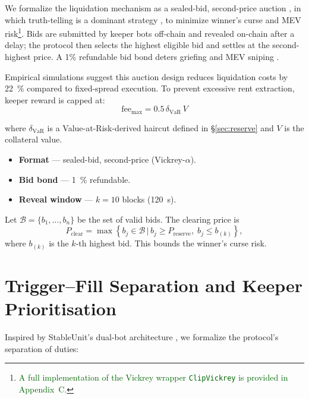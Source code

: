 \documentclass[11pt]{article}
\newcommand{\secref}[1]{\hyperref[#1]{\S\ref*{#1}}}
\begin{document}
We formalize the liquidation mechanism as a sealed-bid, second-price auction \parencite{vickrey1961counterspeculation}, in which truth-telling is a dominant strategy \parencite{myerson1994bayesian}, to minimize winner’s curse and MEV risk\footnote{\textcolor{darkgreen}{A full implementation of the Vickrey wrapper \texttt{ClipVickrey} is provided in Appendix~C.}}. Bids are submitted by keeper bots off-chain and revealed on-chain after a delay; the protocol then selects the highest eligible bid and settles at the second-highest price. A 1\% refundable bid bond deters griefing and MEV sniping \parencite{tian2025defi}.

Empirical simulations suggest this auction design reduces liquidation costs by \SI{22}{\percent} compared to fixed-spread execution. To prevent excessive rent extraction, keeper reward is capped at:
\begin{equation}
\text{fee}_{\max} = 0.5\, \delta_{\text{VaR}}\, V
\end{equation}

where \(\delta_{\text{VaR}}\) is a Value-at-Risk-derived haircut defined in \secref{sec:reserve} and \( V \) is the collateral value.

\begin{itemize}[leftmargin=*]
  \item \textbf{Format} — sealed-bid, second-price (Vickrey-$\alpha$).
  \item \textbf{Bid bond} — \SI{1}{\percent} refundable.
  \item \textbf{Reveal window} — $k{=}10$ blocks (\SI{120}{\second}).
\end{itemize}

Let $\mathcal{B} = \{b_1, \dots, b_n\}$ be the set of valid bids. The clearing price is
\[
P_{\text{clear}} = \max\left\{ b_j \in \mathcal{B} \,|\, b_j \geq P_{\text{reserve}},\; b_j \leq b_{(k)} \right\},
\]
where $b_{(k)}$ is the $k$-th highest bid. This bounds the winner's curse risk.


\section{Trigger–Fill Separation and Keeper Prioritisation}
\label{sec:bots}
Inspired by StableUnit’s dual-bot architecture \parencite{stableunit2025spec}, we formalize the protocol's separation of duties:
\end{document}
